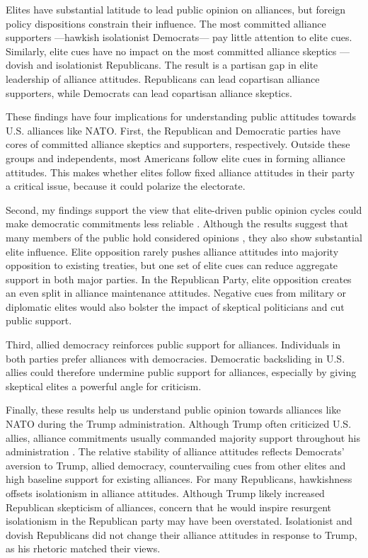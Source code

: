 \documentclass[12pt]{article}
\begin{document}
Elites have substantial latitude to lead public opinion on alliances, but foreign policy dispositions constrain their influence. 
The most committed alliance supporters ---hawkish isolationist Democrats--- pay little attention to elite cues.
Similarly, elite cues have no impact on the most committed alliance skeptics --- dovish and isolationist Republicans. 
The result is a partisan gap in elite leadership of alliance attitudes. 
Republicans can lead copartisan alliance supporters, while Democrats can lead copartisan alliance skeptics. 


These findings have four implications for understanding public attitudes towards U.S. alliances like NATO. 
First, the Republican and Democratic parties have cores of committed alliance skeptics and supporters, respectively.
Outside these groups and independents, most Americans follow elite cues in forming alliance attitudes. 
This makes whether elites follow fixed alliance attitudes in their party a critical issue, because it could polarize the electorate.  


Second, my findings support the view that elite-driven public opinion cycles could make democratic commitments less reliable \citep{GartzkeGleditsch2004}. 
Although the results suggest that many members of the public hold considered opinions \citep{PageShapiro1992}, they also show substantial elite influence. 
Elite opposition rarely pushes alliance attitudes into majority opposition to existing treaties, but one set of elite cues can reduce aggregate support in both major parties.
In the Republican Party, elite opposition creates an even split in alliance maintenance attitudes. 
Negative cues from military or diplomatic elites would also bolster the impact of skeptical politicians and cut public support. 


Third, allied democracy reinforces public support for alliances.
Individuals in both parties prefer alliances with democracies. 
Democratic backsliding in U.S. allies could therefore undermine public support for alliances, especially by giving skeptical elites a powerful angle for criticism. 


Finally, these results help us understand public opinion towards alliances like NATO during the Trump administration.
Although Trump often criticized U.S. allies, alliance commitments usually commanded majority support throughout his administration \citep{PewNATO2020}. 
The relative stability of alliance attitudes reflects Democrats' aversion to Trump, allied democracy, countervailing cues from other elites and high baseline support for existing alliances. 
For many Republicans, hawkishness offsets isolationism in alliance attitudes.
Although Trump likely increased Republican skepticism of alliances, concern that he would inspire resurgent isolationism in the Republican party may have been overstated.
Isolationist and dovish Republicans did not change their alliance attitudes in response to Trump, as his rhetoric matched their views. 
\end{document}
